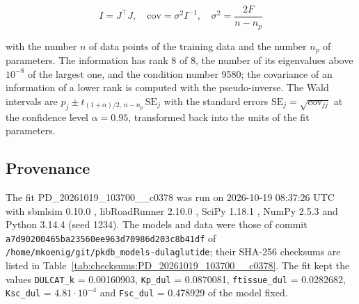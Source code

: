 \begin{equation}
I = J^\top J, \quad \mathrm{cov} = \sigma^2 I^{-1}, \quad \sigma^2 = \frac{2 F}{n - n_p}
\end{equation}

with the number $n$ of data points of the training data and the number $n_p$ of parameters. The information has rank 8 of 8, the number of its eigenvalues above $10^{-8}$ of the largest one, and the condition number 9580; the covariance of an information of a lower rank is computed with the pseudo-inverse. The Wald intervals are $\hat{p}_j \pm t_{(1+\alpha)/2,\, n-n_p}\, \mathrm{SE}_j$ with the standard errors $\mathrm{SE}_j = \sqrt{\mathrm{cov}_{jj}}$ at the confidence level $\alpha = 0.95$, transformed back into the units of the fit parameters.

\subsection{Provenance}

The fit PD\_20261019\_103700\_\_c0378 was run on 2026-10-19 08:37:26 UTC with sbmlsim 0.10.0 \cite{Koenig2026_sbmlsim}, libRoadRunner 2.10.0 \cite{Welsh2023}, SciPy 1.18.1 \cite{Virtanen2020}, NumPy 2.5.3 \cite{Harris2020} and Python 3.14.4 (seed 1234). The models and data were those of commit \texttt{a7d90200465ba23560ee963d70986d203c8b41df} of \texttt{/home/mkoenig/git/pkdb\_models-dulaglutide}; their SHA-256 checksums are listed in Table~\ref{tab:checksums:PD_20261019_103700__c0378}. The fit kept the values \texttt{DULCAT\_k} = 0.00160903, \texttt{Kp\_dul} = 0.0870081, \texttt{ftissue\_dul} = 0.0282682, \texttt{Ksc\_dul} = $4.81 \cdot 10^{-4}$ and \texttt{Fsc\_dul} = 0.478929 of the model fixed.

